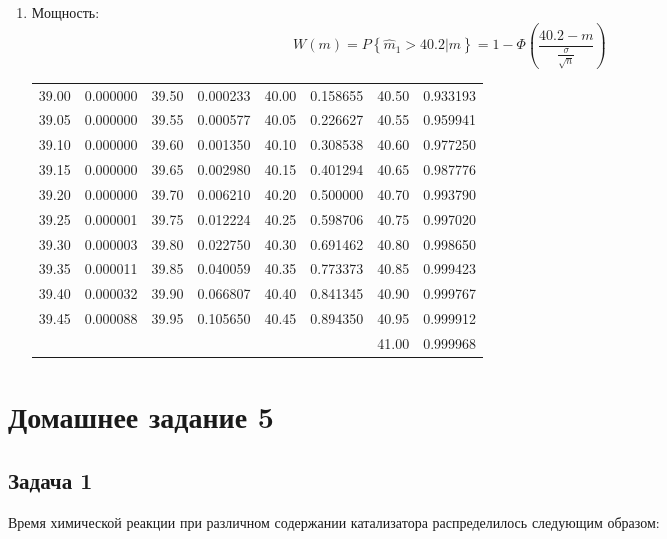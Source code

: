 \documentclass[a4paper,12pt]{article}
\newcommand{\probability}[1]{P \left\{ #1 \right\}}
\begin{document}
\begin{enumerate}
        \item Мощность:
              \[
                  W(m)
                  = \probability{\widehat{m}_1 > 40.2 | m}
                  = 1 - \Phi \left( \frac{40.2 - m}{\frac{\sigma}{\sqrt{n}}} \right)
              \]
              \begin{tabular}{|c|c|c|c|c|c|c|c|}
                  \hline
                  39.00 & 0.000000 & 39.50 & 0.000233 & 40.00 & 0.158655 & 40.50 & 0.933193 \\
                  39.05 & 0.000000 & 39.55 & 0.000577 & 40.05 & 0.226627 & 40.55 & 0.959941 \\
                  39.10 & 0.000000 & 39.60 & 0.001350 & 40.10 & 0.308538 & 40.60 & 0.977250 \\
                  39.15 & 0.000000 & 39.65 & 0.002980 & 40.15 & 0.401294 & 40.65 & 0.987776 \\
                  39.20 & 0.000000 & 39.70 & 0.006210 & 40.20 & 0.500000 & 40.70 & 0.993790 \\
                  39.25 & 0.000001 & 39.75 & 0.012224 & 40.25 & 0.598706 & 40.75 & 0.997020 \\
                  39.30 & 0.000003 & 39.80 & 0.022750 & 40.30 & 0.691462 & 40.80 & 0.998650 \\
                  39.35 & 0.000011 & 39.85 & 0.040059 & 40.35 & 0.773373 & 40.85 & 0.999423 \\
                  39.40 & 0.000032 & 39.90 & 0.066807 & 40.40 & 0.841345 & 40.90 & 0.999767 \\
                  39.45 & 0.000088 & 39.95 & 0.105650 & 40.45 & 0.894350 & 40.95 & 0.999912 \\
                  \hline
                        &          &       &          &       &          & 41.00 & 0.999968 \\
                  \hline
              \end{tabular}
    \end{enumerate}
\fi

\section*{Домашнее задание 5}

\subsection*{Задача 1 \cite[278]{Efimov}}

Время химической реакции при различном содержании катализатора распределилось следующим образом:
\end{document}
